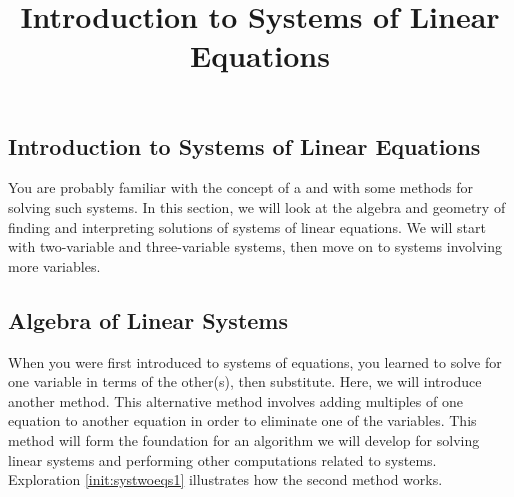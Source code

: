 \documentclass{ximera}
\title{Introduction to Systems of Linear Equations} \license{CC BY-NC-SA 4.0}
\begin{document}
\begin{abstract}
\end{abstract}
\maketitle

\begin{onlineOnly}
\section*{Introduction to Systems of Linear Equations}
\end{onlineOnly}

You are probably familiar with the concept of a  and with some methods for solving such systems.  In this section, we will look at the algebra and geometry of finding and interpreting solutions of systems of linear equations.  We will start with two-variable and three-variable systems, then move on to systems involving more variables.  

\subsection*{Algebra of Linear Systems}
When you were first introduced to systems of equations, you learned to solve for one variable in terms of the other(s), then substitute.  Here, we will introduce another method.  This alternative method involves adding multiples of one equation to another equation in order to eliminate one of the variables.  This method will form the foundation for an algorithm we will develop for solving linear systems and performing other computations related to systems.  Exploration \ref{init:systwoeqs1} illustrates how the second method works.
\end{document}

